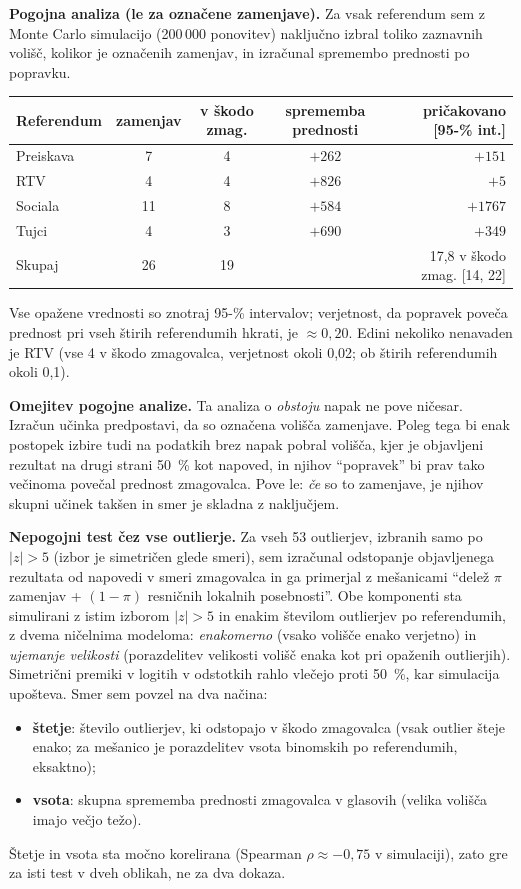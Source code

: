 \documentclass[11pt,a4paper]{article}
\begin{document}
\textbf{Pogojna analiza (le za označene zamenjave).} Za vsak referendum sem z Monte Carlo simulacijo (200\,000 ponovitev) naključno izbral toliko zaznavnih volišč, kolikor je označenih zamenjav, in izračunal spremembo prednosti po popravku.

\begin{center}
\small\begin{tabular}{lcccr}
\toprule
Referendum & zamenjav & v škodo zmag. & sprememba prednosti & pričakovano [95-\% int.] \\
\midrule
Preiskava & 7 & 4 & $+262$ & $+151$ \; [$-1008$, $+1786$] \\
RTV & 4 & 4 & $+826$ & $+5$ \; [$-844$, $+1256$] \\
Sociala & 11 & 8 & $+584$ & $+1767$ \; [$+276$, $+3028$] \\
Tujci & 4 & 3 & $+690$ & $+349$ \; [$-704$, $+1122$] \\
\midrule
Skupaj & 26 & 19 & & 17,8 v škodo zmag. [14, 22] \\
\bottomrule
\end{tabular}
\end{center}

Vse opažene vrednosti so znotraj 95-\% intervalov; verjetnost, da popravek poveča prednost pri vseh štirih referendumih hkrati, je $\approx0{,}20$. Edini nekoliko nenavaden je RTV (vse 4 v škodo zmagovalca, verjetnost okoli 0,02; ob štirih referendumih okoli 0,1).

\textbf{Omejitev pogojne analize.} Ta analiza o \emph{obstoju} napak ne pove ničesar. Izračun učinka predpostavi, da so označena volišča zamenjave. Poleg tega bi enak postopek izbire tudi na podatkih brez napak pobral volišča, kjer je objavljeni rezultat na drugi strani 50~\% kot napoved, in njihov ``popravek'' bi prav tako večinoma povečal prednost zmagovalca. Pove le: \emph{če} so to zamenjave, je njihov skupni učinek takšen in smer je skladna z naključjem.

\textbf{Nepogojni test čez vse outlierje.} Za vseh 53 outlierjev, izbranih samo po $|z|>5$ (izbor je simetričen glede smeri), sem izračunal odstopanje objavljenega rezultata od napovedi v smeri zmagovalca in ga primerjal z mešanicami ``delež $\pi$ zamenjav + $(1-\pi)$ resničnih lokalnih posebnosti''. Obe komponenti sta simulirani z istim izborom $|z|>5$ in enakim številom outlierjev po referendumih, z dvema ničelnima modeloma: \emph{enakomerno} (vsako volišče enako verjetno) in \emph{ujemanje velikosti} (porazdelitev velikosti volišč enaka kot pri opaženih outlierjih). Simetrični premiki v logitih v odstotkih rahlo vlečejo proti 50~\%, kar simulacija upošteva. Smer sem povzel na dva načina:
\begin{itemize}
\item \textbf{štetje}: število outlierjev, ki odstopajo v škodo zmagovalca (vsak outlier šteje enako; za mešanico je porazdelitev vsota binomskih po referendumih, eksaktno);
\item \textbf{vsota}: skupna sprememba prednosti zmagovalca v glasovih (velika volišča imajo večjo težo).
\end{itemize}
Štetje in vsota sta močno korelirana (Spearman $\rho\approx-0{,}75$ v simulaciji), zato gre za isti test v dveh oblikah, ne za dva dokaza.
\end{document}
